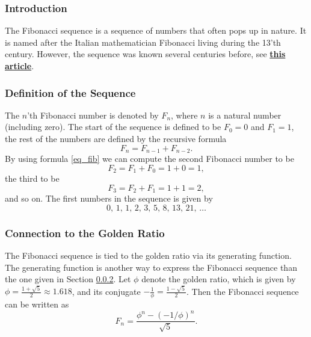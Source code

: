 \documentclass[12pt, titlepage]{article}
\begin{document}
\subsubsection{Introduction}
The Fibonacci sequence is a sequence of numbers that often pops up in nature. It is named after the Italian mathematician Fibonacci living during the 13'th century. However, the sequence was known several centuries before, see \href{https://www.bing.com/ck/a?!&&p=08068f3e5b6ab4cdJmltdHM9MTY3OTYxNjAwMCZpZ3VpZD0xZTgzZmFhYS0zMTUwLTYzYWYtMzM4MS1lODA3MzA0MjYyNzUmaW5zaWQ9NTI0MA&ptn=3&hsh=3&fclid=1e83faaa-3150-63af-3381-e80730426275&psq=fibonacci&u=a1aHR0cHM6Ly9wbC53aWtpcGVkaWEub3JnL3dpa2kvQ2klQzQlODVnX0ZpYm9uYWNjaWVnbw&ntb=1}{\textbf{this article}}.

\subsubsection{Definition of the Sequence} \label{sec_def_of_seq}
The $n$'th Fibonacci number is denoted by $F_{n}$, where $n$ is a natural number (including zero). The start of the sequence is defined to be $F_{0}=0$ and $F_{1}=1$, the rest of the numbers are defined by the recursive formula 
\begin{equation} \label{eq_fib}
    F_{n}=F_{n-1}+F_{n-2}.
\end{equation}
By using formula \eqref{eq_fib} we can compute the second Fibonacci number to be 
\[F_2=F_1+F_0=1+0=1,\]
the third to be 
\[F_3=F_2+F_1=1+1=2,\]
and so on.
The first numbers in the sequence is given by
\[0,\, 1,\, 1,\, 2,\, 3,\, 5,\, 8,\, 13,\, 21,\, \dots \]
\subsubsection{Connection to the Golden Ratio}
The Fibonacci sequence is tied to the golden ratio via its generating function. The generating function is another way to express the Fibonacci sequence than the one given in Section \ref{sec_def_of_seq}. Let $\phi$ denote the golden ratio, which is given by $\phi=\frac{1+\sqrt{5}}{2} \approx 1.618$, and its conjugate $-\frac{1}{\phi}=\frac{1-\sqrt{5}}{2}$. Then the Fibonacci sequence can be written as 
\[F_n = \frac{\phi^n-(-1/\phi)^n}{\sqrt{5}}.\]
\end{document}
